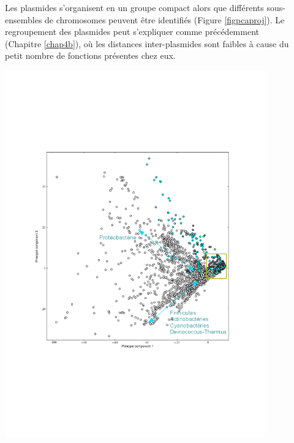 \newpage
\begin{description}
\item[\textbullet] Les plasmides s'organisent en un groupe compact alors que différents sous-ensembles de chromosomes peuvent être identifiés (Figure \ref{figpcaproj}). Le regroupement des plasmides peut s'expliquer comme précédemment (Chapitre \ref{chap4b}), où les distances inter-plasmides sont faibles à cause du petit nombre de fonctions présentes chez eux.
\end{description}

\begin{figure}[H]
	\begin{minipage}{0.55\textwidth}
		\includegraphics[trim=2cm 7cm 2cm 6cm,clip, width=\textwidth]{./img/pca_func.png}
		\label{figpcavr}
	\end{minipage}
	\begin{minipage}{0.55\textwidth}

\end{minipage}
\end{figure}

